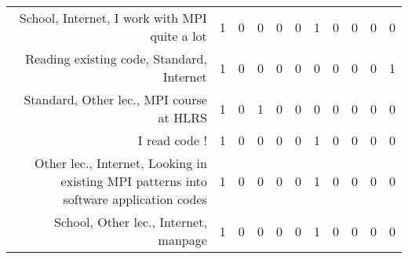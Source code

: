 {\begin{landscape}
\begin{longtable}[htb]{r|c|c|c|c|c|c|c|c|c|c}
{School, Internet, I work with MPI quite a lot} & 1 & 0 & 0 & 0 & 0 & 1 & 0 & 0 & 0 & 0 \\%
{Reading existing code, Standard, Internet} & 1 & 0 & 0 & 0 & 0 & 0 & 0 & 0 & 0 & 1 \\%
{Standard, Other lec., MPI course at HLRS} & 1 & 0 & 1 & 0 & 0 & 0 & 0 & 0 & 0 & 0 \\%
{I read code !} & 1 & 0 & 0 & 0 & 0 & 1 & 0 & 0 & 0 & 0 \\%
{Other lec., Internet, Looking in existing MPI patterns into software application codes} & 1 & 0 & 0 & 0 & 0 & 1 & 0 & 0 & 0 & 0 \\%
{School, Other lec., Internet, manpage} & 1 & 0 & 0 & 0 & 0 & 1 & 0 & 0 & 0 & 0 \\%
\hline%
\end{longtable}%
\end{landscape}}%
\clearpage%
